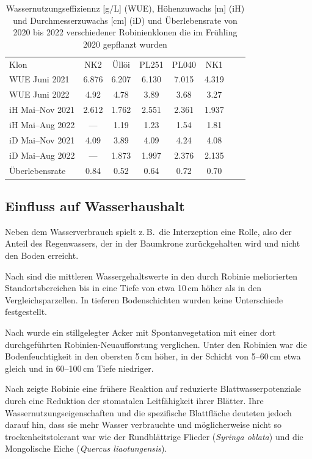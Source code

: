 \documentclass[twocolumn]{scrartcl}
\begin{document}
\begin{table}[htbp]
  \centering
  \begin{tabular}{l *{7}{S[table-format=1.3]}}
    Klon    &  {NK2} & {Üllöi} & {PL251} & {PL040} & {NK1} \\[.3em]
    WUE Juni 2021 & 6.876 & 6.207 & 6.130 & 7.015 & 4.319 \\
    WUE Juni 2022 &  4.92 & 4.78 & 3.89 & 3.68 & 3.27 \\[.3em]
    iH Mai--Nov 2021 & 2.612 & 1.762 & 2.551 & 2.361 & 1.937 \\
    iH Mai--Aug 2022 & {---} & 1.19 & 1.23 & 1.54 & 1.81 \\[.3em]
    iD Mai--Nov 2021 & 4.09 & 3.89 & 4.09 & 4.24 & 4.08 \\
    iD Mai--Aug 2022 & {---} & 1.873 & 1.997 & 2.376 & 2.135\\[.3em]
    Überlebensrate & 0.84 & 0.52 & 0.64 & 0.72 & 0.70
  \end{tabular}
  \caption{Wassernutzungseffiziennz [g/L] (WUE), Höhenzuwachs [m] (iH) und
    Durchmesserzuwachs [cm] (iD) und Überlebensrate von 2020 bis 2022 verschiedener Robinienklonen die im
    Frühling 2020 gepflanzt wurden
  \citep{abri2022robinieTrokenresistenz,abri2023robiieWasser,abri2023robinieDroughtTolerance}}
  \label{tab:WUErobinie}
\end{table}

\subsection{Einfluss auf Wasserhaushalt}

Neben dem Wasserverbrauch spielt z.\,B.\ die Interzeption eine Rolle, also der Anteil des Regenwassers, der in der Baumkrone zurückgehalten wird und nicht den Boden erreicht.

Nach \citet{gemeinhardt1959robinie} sind die mittleren Wassergehaltswerte in den durch Robinie meliorierten Standortsbereichen bis in eine Tiefe von etwa 10\,cm höher als in den Vergleichsparzellen. In tieferen Bodenschichten wurden keine Unterschiede festgestellt.

Nach \citet{kou2016robinieBoden} wurde ein stillgelegter Acker mit Spontanvegetation mit einer dort durchgeführten Robinien-Neuaufforstung verglichen. Unter den Robinien war die Bodenfeuchtigkeit in den obersten 5\,cm höher, in der Schicht von 5--60\,cm etwa gleich und in 60--100\,cm Tiefe niedriger.

Nach \citet{yan2009robinieVergleich} zeigte Robinie eine frühere Reaktion auf reduzierte Blattwasserpotenziale durch eine Reduktion der stomatalen Leitfähigkeit ihrer Blätter. Ihre Wassernutzungseigenschaften und die spezifische Blattfläche deuteten jedoch darauf hin, dass sie mehr Wasser verbrauchte und möglicherweise nicht so trockenheitstolerant war wie der Rundblättrige Flieder (\emph{Syringa oblata}) und die Mongolische Eiche (\emph{Quercus liaotungensis}).
\end{document}
